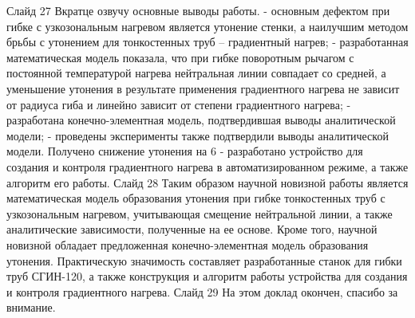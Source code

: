 Слайд 27
Вкратце озвучу основные выводы работы.
- основным дефектом при гибке с узкозональным нагревом является утонение стенки, а наилучшим методом брьбы с утонением для тонкостенных труб – градиентный нагрев;
- разработанная математическая модель показала, что при гибке поворотным рычагом с постоянной температурой нагрева нейтральная линии совпадает со средней, а уменьшение утонения в результате применения градиентного нагрева не зависит от радиуса гиба и линейно зависит от степени градиентного нагрева;
- разработана конечно-элементная модель, подтвердившая выводы аналитической модели;
- проведены эксперименты также подтвердили выводы аналитической модели. Получено снижение утонения на 6%
- разработано устройство для создания и контроля градиентного нагрева в автоматизированном режиме, а также алгоритм его работы.
Слайд 28
Таким образом научной новизной работы является математическая модель образования утонения при гибке тонкостенных труб с узкозональным нагревом, учитывающая смещение нейтральной линии, а также аналитические зависимости, полученные на ее основе. Кроме того, научной новизной обладает предложенная конечно-элементная модель образования утонения.
Практическую значимость составляет разработанные станок для гибки труб СГИН-120, а также конструкция и алгоритм работы устройства для создания и контроля градиентного нагрева.
Слайд 29
На этом доклад окончен, спасибо за внимание.

